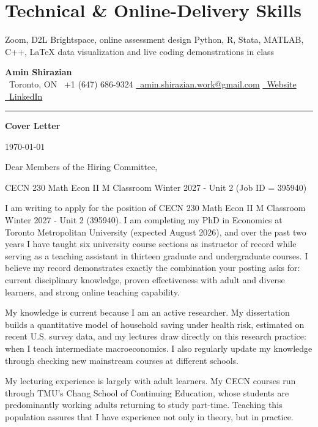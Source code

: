\documentclass[10.5pt]{article}
\makeatletter
\newcommand{\headingfont}{\sffamily}
\newcommand{\nameblock}{%
	{\headingfont\LARGE\bfseries Amin Shirazian}\\[2pt]
	\faMapMarker*\ Toronto, ON \;\textbar\; \faPhone\ +1 (647) 686-9324 \;\textbar\; \href{mailto:amin.shirazian.work@gmail.com}{\faEnvelope\ amin.shirazian.work@gmail.com} \;\textbar\; \href{https://aminshz.github.io/my-website/}{\faGlobe\ Website} \;\textbar\; \href{https://linkedin.com/in/amin-shirazian}{\faLinkedin\ LinkedIn}\\[-4pt]
	\rule{\textwidth}{1pt}}
\makeatother
\begin{document}
	
	\section{Technical \& Online-Delivery Skills}
	Zoom, D2L Brightspace, online assessment design \;\textbar\; Python, R, Stata, MATLAB, C++, \LaTeX \;\textbar\; data visualization and live coding demonstrations in class
	
	\newpage
	\nameblock
	\begin{center}{\headingfont\Large\bfseries Cover Letter}\end{center}	
	
	\vspace{6pt}
	\today
	
	
	Dear Members of the Hiring Committee,
	
	
	CECN 230 Math Econ II M Classroom Winter 2027 - Unit 2 (Job ID = 395940)


	I am writing to apply for the position of {CECN 230 Math Econ II M Classroom Winter 2027 - Unit 2 (395940)}. I am completing my PhD in Economics at Toronto Metropolitan University (expected August 2026), and over the past two years I have taught six university course sections as instructor of record while serving as a teaching assistant in thirteen graduate and undergraduate courses. I believe my record demonstrates exactly the combination your posting asks for: current disciplinary knowledge, proven effectiveness with adult and diverse learners, and strong online teaching capability.
	
	My knowledge is current because I am an active researcher. My dissertation builds a quantitative model of household saving under health risk, estimated on recent U.S. survey data, and my lectures draw directly on this research practice: when I teach intermediate macroeconomics. I also regularly update my knowledge through checking new mainstream courses at different schools. 
	
	My lecturing experience is largely with adult learners. My CECN courses run through TMU's Chang School of Continuing Education, whose students are predominantly working adults returning to study part-time. Teaching this population assures that I have experience not only in theory, but in practice.
	
\end{document}
